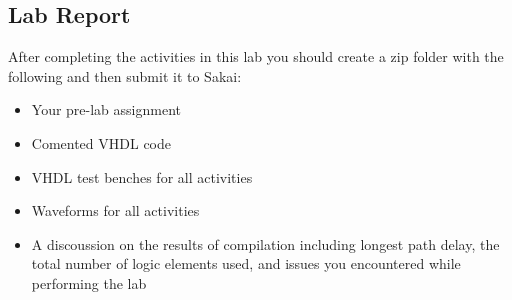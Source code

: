 \subsection{Lab Report}
After completing the activities in this lab you should create a zip folder with the following and then submit it to Sakai:

\begin{itemize}
	\item Your pre-lab assignment
	\item Comented VHDL code
	\item VHDL test benches for all activities
	\item Waveforms for all activities
	\item A discoussion on the results of compilation including longest path delay, the total number of logic elements used, and issues you encountered while performing the lab
\end{itemize}